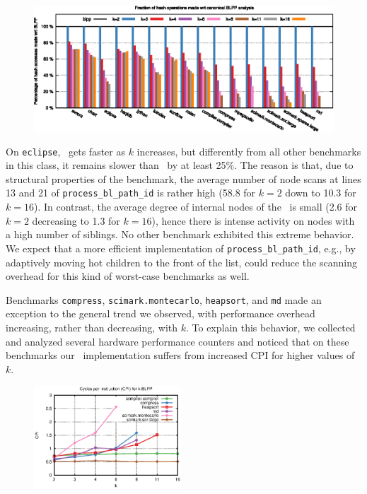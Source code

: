 \ifdefined\noauthorea
\begin{figure}[!ht]
\begin{center}
\includegraphics[width=\textwidth]{figures/kblpp-hash/kblpp-hash.eps}
\caption{\protect}
\end{center}
\end{figure}
\fi

On {\tt eclipse}, \kblpp\ gets faster as $k$ increases, but differently from all other benchmarks in this class, it remains slower than \blpp\ by at least 25\%. The reason is that, due to structural properties of the benchmark, the average number of node scans at lines 13 and 21 of {\tt process\_bl\_path\_id} is rather high (58.8 for $k=2$ down to 10.3 for $k=16$). In contrast, the average degree of internal nodes of the \ksf\ is small (2.6 for $k=2$ decreasing to 1.3 for $k=16$), hence there is intense activity on nodes with a high number of siblings. No other benchmark exhibited this extreme behavior. We expect that a more efficient implementation of {\tt process\_bl\_path\_id}, e.g., by adaptively moving hot children to the front of the list, could reduce the scanning overhead for this kind of worst-case benchmarks as well.

\noindent Benchmarks {\tt compress}, {\tt scimark.montecarlo}, {\tt heapsort}, and {\tt md} made an exception to the general trend we observed, with performance overhead increasing, rather than decreasing, with $k$. To explain this behavior, we collected and analyzed several hardware performance counters and noticed that on these benchmarks our \kblpp\ implementation suffers from increased CPI for higher values of $k$.

\ifdefined\noauthorea
\begin{figure}[!ht]
\begin{center}
\includegraphics[width=0.49\textwidth]{figures/kblpp-cpi/kblpp-cpi.eps}
\caption{\protect}
\end{center}
\end{figure}
\fi

